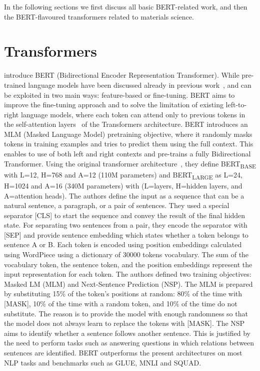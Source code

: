 In the following sections we first discuss all basic BERT-related work, and then the BERT-flavoured transformers related to materials science. 

\section{Transformers}

\cite{devlin2018bert} introduce BERT (Bidirectional Encoder Representation Transformer). 
While pre-trained language models have been discussed already in previous work~\cite{radford2018improving}, and can be exploited in two main ways: feature-based or fine-tuning. 
BERT aims to improve the fine-tuning approach and to solve the limitation of existing left-to-right language models, where each token can attend only to previous tokens in the self-attention layers~\cite{vaswani2017attention} of the Transformers architecture. 
BERT introduces an MLM (Masked Language Model) pretraining objective, where it randomly masks tokens in training examples and tries to predict them using the full context. This enables to use of both left and right contexts and pre-trains a fully Bidirectional Transformer.
Using the original transformer architecture~\cite{vaswani2017attention}, they define BERT\textsubscript{BASE} with L=12, H=768 and A=12 (110M parameters) and BERT\textsubscript{LARGE} as L=24, H=1024 and A=16 (340M parameters) with (L=layers, H=hidden layers, and A=attention heads).
The authors define the input as a sequence that can be a natural sentence, a paragraph, or a pair of sentences. They used a special separator [CLS] to start the sequence and convey the result of the final hidden state. For separating two sentences from a pair, they encode the separator with [SEP] and provide sentence embedding which states whether a token belongs to sentence A or B. 
Each token is encoded using position embeddings calculated using WordPiece using a dictionary of 30000 tokens vocabulary. 
The sum of the vocabulary token, the sentence token, and the position embeddings represent the input representation for each token. 
The authors defined two training objectives: Masked LM (MLM) and Next-Sentence Prediction (NSP). 
The MLM is prepared by substituting 15\% of the token's positions at random: 80\% of the time with [MASK], 10\% of the time with a random token, and 10\% of the time do not substitute. The reason is to provide the model with enough randomness so that the model does not always learn to replace the tokens with [MASK]. 
The NSP aims to identify whether a sentence follows another sentence. This is justified by the need to perform tasks such as answering questions in which relations between sentences are identified. 
BERT outperforms the present architectures on most NLP tasks and benchmarks such as GLUE, MNLI and SQUAD. 

